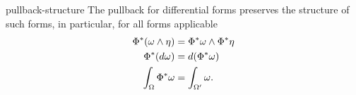 \begin{Lemma}{pullback-structure}
  The pullback for differential forms preserves the structure of such
  forms, in particular, for all forms applicable
  \begin{align}
    \Phi^*(\omega\wedge \eta) &= \Phi^* \omega \wedge \Phi^*\eta\\
    \Phi^*(d\omega) &= d(\Phi^*\omega)\\
    \int_{\Omega} \Phi^*\omega &= \int_{\Omega'} \omega.
  \end{align}
\end{Lemma}

